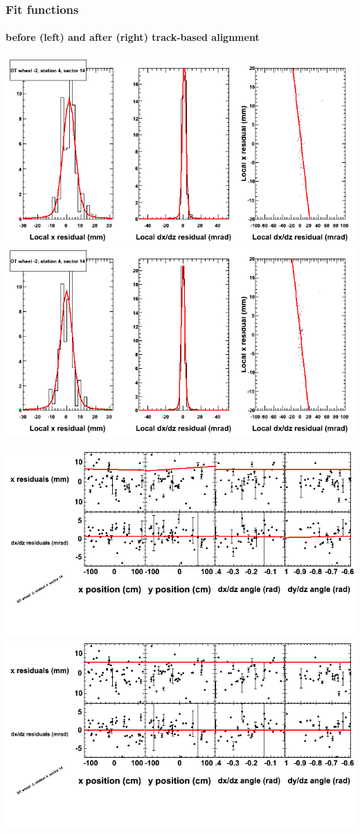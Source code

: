 \documentclass[compress]{beamer}
\begin{document}
\begin{frame}
\frametitle{Fit functions}
\framesubtitle{before (left) and after (right) track-based alignment}
\includegraphics[width=0.5\linewidth]{fitfunctions_re01/MBwhAst4sec14_bellcurves.png} \includegraphics[width=0.5\linewidth]{fitfunctions_re05/MBwhAst4sec14_bellcurves.png}

\includegraphics[width=0.5\linewidth]{fitfunctions_re01/MBwhAst4sec14_polynomials.png} \includegraphics[width=0.5\linewidth]{fitfunctions_re05/MBwhAst4sec14_polynomials.png}
\end{frame}
\end{document}
